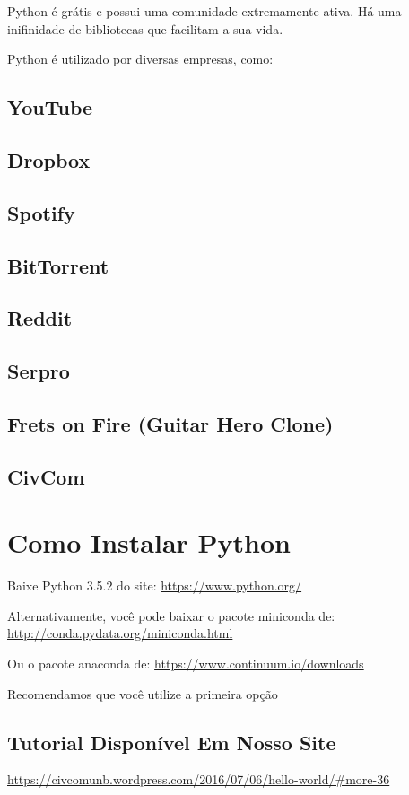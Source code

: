 \documentclass[presentation]{beamer}
\begin{document}
Python é grátis e possui uma comunidade extremamente ativa. Há uma inifinidade de bibliotecas que facilitam a sua vida.

Python é utilizado por diversas empresas, como:
\subsection{YouTube}
\label{sec:orgheadline4}
\subsection{Dropbox}
\label{sec:orgheadline5}
\subsection{Spotify}
\label{sec:orgheadline6}
\subsection{BitTorrent}
\label{sec:orgheadline7}
\subsection{Reddit}
\label{sec:orgheadline8}
\subsection{Serpro}
\label{sec:orgheadline9}
\subsection{Frets on Fire (Guitar Hero Clone)}
\label{sec:orgheadline10}
\subsection{CivCom}
\label{sec:orgheadline11}
\section{Como Instalar Python}
\label{sec:orgheadline14}
Baixe Python 3.5.2 do site: \url{https://www.python.org/}

Alternativamente, você pode baixar o pacote miniconda de: \url{http://conda.pydata.org/miniconda.html}

Ou o pacote anaconda de: \url{https://www.continuum.io/downloads}

Recomendamos que você utilize a primeira opção
\subsection{Tutorial Disponível Em Nosso Site}
\label{sec:orgheadline13}
\url{https://civcomunb.wordpress.com/2016/07/06/hello-world/#more-36}
\end{document}
